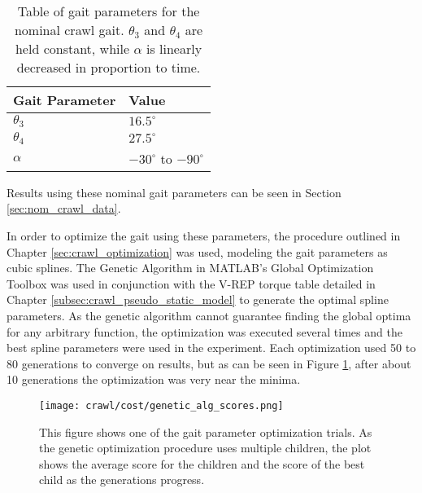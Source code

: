 \begin{table}
  \centering
  \begin{tabularx}{0.5\textwidth}{|l||X|}
    \hline
    \textbf{Gait Parameter} & \textbf{Value}                \\  \hline\hline
    $\theta_3$              &   $16.5^\circ$                \\ 
    $\theta_4$              &   $27.5^\circ$                \\  
    $\alpha$                &   $-30^\circ$ to $-90^\circ$  \\  \hline
  \end{tabularx} 
  
  \caption{Table of gait parameters for the nominal crawl gait. $\theta_3$ and $\theta_4$
           are held constant, while $\alpha$ is linearly decreased in proportion to time.}
  \label{tab:nominal_parameters}
\end{table}

Results using these nominal gait parameters can be seen in Section \ref{sec:nom_crawl_data}.


In order to optimize the gait using these parameters, the procedure outlined in Chapter 
\ref{sec:crawl_optimization} was used, modeling the gait parameters as cubic splines.
The Genetic Algorithm in MATLAB's Global Optimization Toolbox was used in conjunction
with the V-REP torque table detailed in Chapter \ref{subsec:crawl_pseudo_static_model}
to generate the optimal spline parameters. 
As the genetic algorithm cannot guarantee finding the global optima for any arbitrary function,
the optimization was executed several times and the best spline parameters were used
in the experiment. Each optimization used 50 to 80 generations to converge on results,
but as can be seen in Figure \ref{fig:ga_generations}, after about 10 generations the
optimization was very near the minima.

\begin{figure}
  \centering
  \texttt{[image: crawl/cost/genetic\_alg\_scores.png]}
  \caption{This figure shows one of the gait parameter optimization trials.
           As the genetic optimization procedure uses multiple children, the 
           plot shows the average score for the children and the score of the best
           child as the generations progress.}
  \label{fig:ga_generations}
\end{figure}

